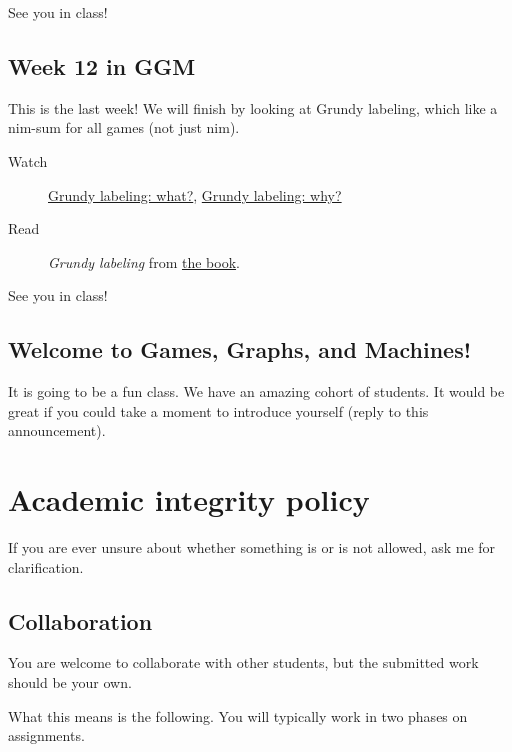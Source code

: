 \documentclass{amsart}
\begin{document}
See you in class!
\subsection{Week 12 in GGM}
\label{sec:orge14ef8b}
This is the last week!  We will finish by looking at Grundy labeling, which like a nim-sum for all games (not just nim).

\begin{description}
\item[{Watch}] \href{https://canvas.anu.edu.au/files/1234702/}{Grundy labeling: what?}, \href{https://canvas.anu.edu.au/files/1234703/}{Grundy labeling: why?}
\item[{Read}] \emph{Grundy labeling} from \href{https://canvas.anu.edu.au/files/715877/}{the book}.
\end{description}

See you in class!
\subsection{Welcome to Games, Graphs, and Machines!}
\label{sec:orga89e9d1}
It is going to be a fun class.  We have an amazing cohort of students.  It would be great if you could take a moment to introduce yourself (reply to this announcement).
\section{Academic integrity policy}
\label{sec:org97134e7}
If you are ever unsure about whether something is or is not allowed, ask me for clarification.
\subsection*{Collaboration}
\label{sec:orgd7b290c}
You are welcome to collaborate with other students, but the submitted work should be your own.

What this means is the following.
You will typically work in two phases on assignments.
\end{document}
